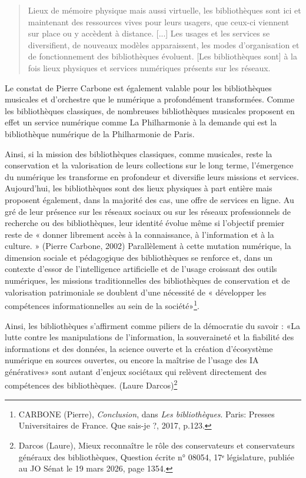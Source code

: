 \begin{quote}
	Lieux de mémoire physique mais aussi virtuelle, les bibliothèques sont ici et maintenant des ressources vives pour leurs usagers, que ceux-ci viennent sur place ou y accèdent à distance. [...] Les usages et les services se diversifient, de nouveaux modèles apparaissent, les modes d'organisation et de fonctionnement des bibliothèques évoluent. [Les bibliothèques sont] à la fois lieux physiques et services numériques présents sur les réseaux.
\end{quote}

Le constat de Pierre Carbone est également valable pour les bibliothèques musicales et d'orchestre que le numérique a profondément transformées. Comme les bibliothèques classiques, de nombreuses bibliothèques musicales proposent en effet un service numérique comme La Philharmonie à la demande qui est la bibliothèque numérique de la Philharmonie de Paris.

 Ainsi, si la mission des bibliothèques classiques, comme musicales, reste la conservation et la valorisation de leurs collections sur le long terme, l’émergence du numérique les transforme en profondeur et diversifie leurs missions et services. Aujourd’hui, les bibliothèques sont des lieux physiques à part entière mais proposent également, dans la majorité des cas, une offre de services en ligne. Au gré de leur présence sur les réseaux sociaux ou sur les réseaux professionnels de recherche ou des bibliothèques, leur identité évolue même si l’objectif premier reste de « donner librement accès à la connaissance, à l’information et à la culture. » (Pierre Carbone, 2002)
Parallèlement à cette mutation numérique, la dimension sociale et pédagogique des bibliothèques se renforce et, dans un contexte d’essor de l’intelligence artificielle et de l’usage croissant des outils numériques, les missions traditionnelles des bibliothèques de conservation et de valorisation patrimoniale se doublent d’une nécessité de  « développer les compétences informationnelles au sein de la société»\footnote{CARBONE (Pierre), \textit{Conclusion}, dans \textit{Les bibliothèques}. Paris: Presses Universitaires de France. Que sais-je ?, 2017, p.123.}.

Ainsi, les bibliothèques s’affirment comme piliers de la démocratie du savoir : «La lutte contre les manipulations de l’information, la souveraineté et la fiabilité des informations et des données, la science ouverte et la création d’écosystème numérique en sources ouvertes, ou encore la maîtrise de l’usage des IA génératives» sont autant d’enjeux sociétaux qui relèvent directement des compétences des bibliothèques. (Laure Darcos)\footnote{Darcos (Laure), Mieux reconnaître le rôle des conservateurs et conservateurs généraux des bibliothèques, Question écrite n° 08054, 17ᵉ législature, publiée au JO Sénat le 19 mars 2026, page 1354.} 

